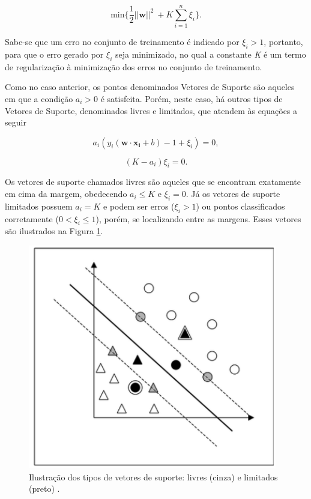 \begin{equation}
\label{eq:eqMinErro}
  \text{min}\{\frac{1}{2}||\boldsymbol{w}||^2\ + K\displaystyle\sum_{i=1}^{n}\xi_i\}.
\end{equation}

Sabe-se que um erro no conjunto de treinamento é indicado por $\xi_i > 1$, portanto, para que o erro gerado por $\xi_i$ seja minimizado, no qual a constante \textit{K} é um termo de regularização à minimização dos erros no conjunto de treinamento.

Como no caso anterior, os pontos denominados Vetores de Suporte são aqueles em que a condição $a_i > 0$ é satisfeita. Porém, neste caso, há outros tipos de Vetores de Suporte, denominados livres e limitados, que atendem às equações a seguir

\begin{equation}
\label{eq:eqCondicaoMarg1}
 a_i(y_i(\boldsymbol{w} \cdot \boldsymbol{x_i} + b) - 1 + \xi_i) = 0,
\end{equation}

\begin{equation}
\label{eq:eqCondicaoMarg2}
 (K - a_i)\xi_i = 0.
\end{equation}



Os vetores de suporte chamados livres são aqueles que se encontram exatamente em cima da margem, obedecendo $a_i \leq K$ e $\xi_i = 0$. Já os vetores de suporte limitados possuem $a_i = K$ e podem ser erros ($\xi_i > 1$) ou pontos classificados corretamente ($0 <\xi_i \leq 1$), porém, se localizando entre as margens. Esses vetores são ilustrados na Figura \ref{fig:margemSuave}.


\begin{figure}[H]
 \centering
  \includegraphics[width=0.4\linewidth]{figuras/margemSuave.pdf}
  \caption{Ilustração dos tipos de vetores de suporte: livres (cinza) e limitados (preto) .}
  \label{fig:margemSuave}
\end{figure}

